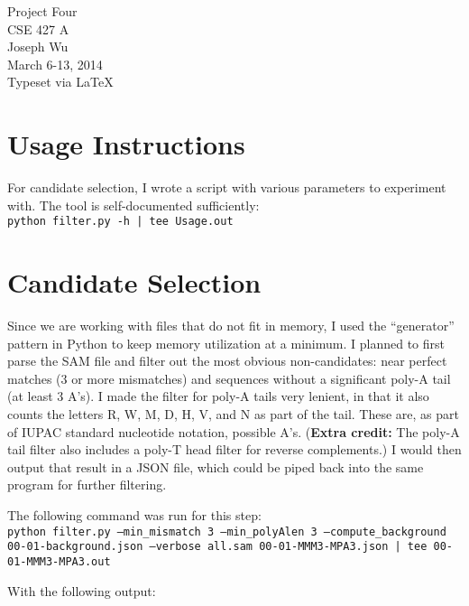 \documentclass[a4paper, 12pt]{report}
\begin{document}
    \begin{center}
        {\LARGE Project Four} \\
        CSE 427 A \\
        Joseph Wu  \\
        March 6-13, 2014 \\
        {\tiny Typeset via \LaTeX}
    \end{center}
    
\section{Usage Instructions}
    For candidate selection, I wrote a script with various parameters to experiment with.  
    The tool is self-documented sufficiently: \\
    \texttt{python filter.py -h | tee Usage.out}
    
    
\section{Candidate Selection}
    Since we are working with files that do not fit in memory, 
        I used the ``generator'' pattern in Python to keep memory utilization at a minimum.
    I planned to first parse the SAM file and filter out the most obvious non-candidates:
        near perfect matches (3 or more mismatches) 
        and sequences without a significant poly-A tail (at least 3 A's). 
    I made the filter for poly-A tails very lenient, 
        in that it also counts the letters R, W, M, D, H, V, and N
        as part of the tail.  
    These are, as part of IUPAC standard nucleotide notation, possible A's.
    (\textbf{Extra credit:} The poly-A tail filter also includes a poly-T head filter for reverse complements.)
    I would then output that result in a JSON file, 
        which could be piped back into the same program for further filtering.
        
    The following command was run for this step: \\
    \texttt{python filter.py --min\_mismatch 3 --min\_polyAlen 3 --compute\_background \\
            00-01-background.json --verbose all.sam 00-01-MMM3-MPA3.json | tee 00-01-MMM3-MPA3.out}
    
    With the following output:
    
    
\end{document}
